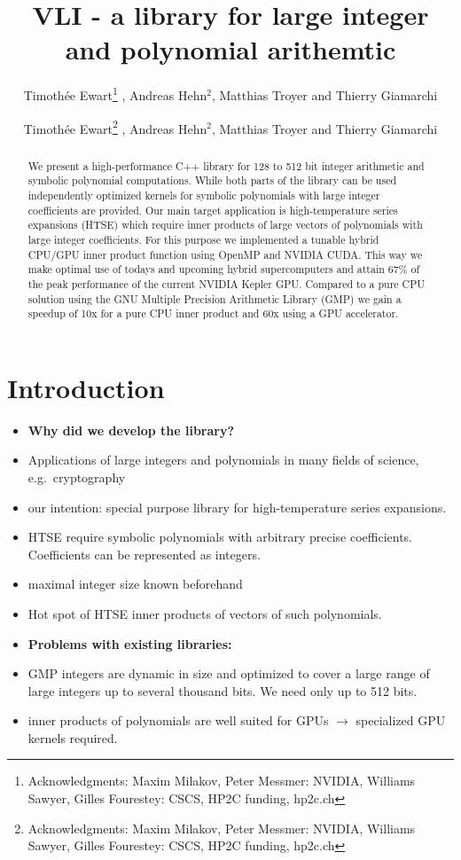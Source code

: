 \documentclass[oribibl]{llncs2e/llncs}
\author{Timoth\'ee Ewart\inst{1}\thanks{Acknowledgments: Maxim Milakov, Peter Messmer:   NVIDIA,   Williams Sawyer, Gilles Fourestey:  CSCS, HP2C funding, hp2c.ch}  , Andreas Hehn$^2$, Matthias Troyer\inst{2} and Thierry Giamarchi\inst{1}}
\institute{Universit\'e de Gen\`eve, \email{timothee.ewart@gmail.com}  \and Eidgen\"ossische Technische Hochschule Z\"urich }
\title{VLI - a library for large integer and polynomial arithemtic}
\author{Timoth\'ee Ewart\inst{1}\thanks{Acknowledgments: Maxim Milakov, Peter Messmer:   NVIDIA,   Williams Sawyer, Gilles Fourestey:  CSCS, HP2C funding, hp2c.ch}  , Andreas Hehn$^2$, Matthias Troyer\inst{2} and Thierry Giamarchi\inst{1}}
\institute{Universit\'e de Gen\`eve, \email{timothee.ewart@gmail.com}  \and Eidgen\"ossische Technische Hochschule Z\"urich }
\begin{document}
\maketitle


\begin{abstract}
We present a high-performance C++ library for 128 to 512 bit integer arithmetic and symbolic polynomial computations.
While both parts of the library can be used independently optimized kernels for symbolic polynomials with large integer coefficients are provided.
Our main target application is high-temperature series expansions (HTSE) which require inner products of large vectors of polynomials with large integer coefficients.
For this purpose we implemented a tunable hybrid CPU/GPU inner product function using OpenMP and NVIDIA CUDA.
This way we make optimal use of todays and upcoming hybrid supercomputers and attain 67\% of the peak performance of the current NVIDIA Kepler GPU.
Compared to a pure CPU solution using the GNU Multiple Precision Arithmetic Library (GMP) we gain a speedup of 10x for a pure CPU inner product and 60x using a GPU accelerator.
\end{abstract}

\section{Introduction}
\begin{itemize}
\item {\bf Why did we develop the library?}
\item Applications of large integers and polynomials in many fields of science, e.g.\ cryptography
\item our intention: special purpose library for high-temperature series expansions.
\item HTSE require symbolic polynomials with arbitrary precise coefficients. Coefficients can be represented as integers.
\item maximal integer size known beforehand
\item Hot spot of HTSE inner products of vectors of such polynomials.
\item {\bf Problems with existing libraries:}
\item GMP integers are dynamic in size and optimized to cover a large range of large integers up to several thousand bits. We need only up to 512 bits.
\item inner products of polynomials are well suited for GPUs $\rightarrow$ specialized GPU kernels required.
\end{itemize}
\end{document}

